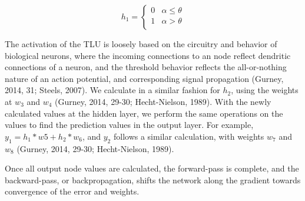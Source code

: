 \documentclass[11pt]{article}
\begin{document}
\[ h_1 = \begin{cases}
	0 & \alpha \leq \theta\\
	1 & \alpha > \theta\\
	\end{cases}
\]

The activation of the TLU is loosely based on the circuitry and behavior of biological neurons, where the incoming connections to an node reflect dendritic connections of a neuron, and the threshold behavior reflects the all-or-nothing nature of an action potential, and corresponding signal propagation (Gurney, 2014, 31; Steels, 2007). We calculate in a similar fashion for $h_2$, using the weights at $w_3$ and $w_4$ (Gurney, 2014, 29-30; Hecht-Nielson, 1989). With the newly calculated values at the hidden layer, we perform the same operations on the values to find the prediction values in the output layer. For example, $y_1 = h_1*w5 + h_2*w_6$, and $y_2$ follows a similar calculation, with weights $w_7$ and $w_8$ (Gurney, 2014, 29-30; Hecht-Nielson, 1989). \par
Once all output node values are calculated, the forward-pass is complete, and the backward-pass, or backpropagation, shifts the network along the gradient towards convergence of the error and weights.
\end{document}
